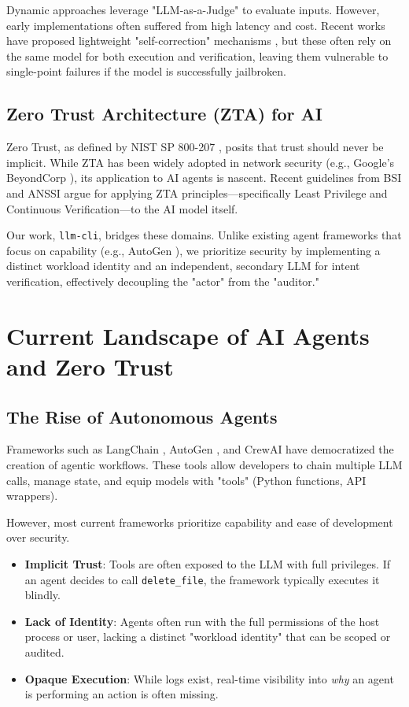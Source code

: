 \documentclass[conference]{IEEEtran}
\begin{document}
Dynamic approaches leverage "LLM-as-a-Judge" to evaluate inputs. However, early implementations often suffered from high latency and cost. Recent works have proposed lightweight "self-correction" mechanisms \cite{pan2023}, but these often rely on the same model for both execution and verification, leaving them vulnerable to single-point failures if the model is successfully jailbroken.

\subsection{Zero Trust Architecture (ZTA) for AI}
Zero Trust, as defined by NIST SP 800-207 \cite{nist}, posits that trust should never be implicit. While ZTA has been widely adopted in network security (e.g., Google's BeyondCorp \cite{beyondcorp}), its application to AI agents is nascent.
Recent guidelines from BSI and ANSSI \cite{bsi_anssi} argue for applying ZTA principles---specifically Least Privilege and Continuous Verification---to the AI model itself.

Our work, \texttt{llm-cli}, bridges these domains. Unlike existing agent frameworks that focus on capability (e.g., AutoGen \cite{autogen}), we prioritize security by implementing a distinct workload identity and an independent, secondary LLM for intent verification, effectively decoupling the "actor" from the "auditor."

\section{Current Landscape of AI Agents and Zero Trust}

\subsection{The Rise of Autonomous Agents}
Frameworks such as LangChain \cite{langchain}, AutoGen \cite{autogen}, and CrewAI have democratized the creation of agentic workflows. These tools allow developers to chain multiple LLM calls, manage state, and equip models with "tools" (Python functions, API wrappers).

However, most current frameworks prioritize capability and ease of development over security.
\begin{itemize}
    \item \textbf{Implicit Trust}: Tools are often exposed to the LLM with full privileges. If an agent decides to call \texttt{delete\_file}, the framework typically executes it blindly.
    \item \textbf{Lack of Identity}: Agents often run with the full permissions of the host process or user, lacking a distinct "workload identity" that can be scoped or audited.
    \item \textbf{Opaque Execution}: While logs exist, real-time visibility into \textit{why} an agent is performing an action is often missing.
\end{itemize}
\end{document}
